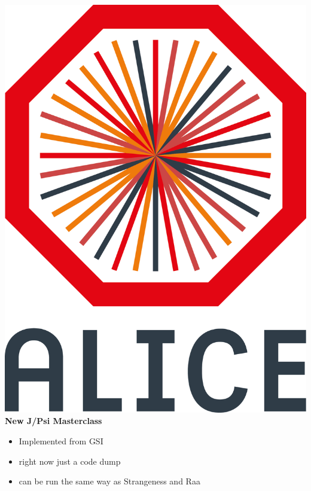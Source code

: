 \documentclass[aspectratio=169,14pt,dvipsnames]{beamer}
\begin{document}
\begin{frame}{\includegraphics[height=0.07\textheight]{2012-Jul-04-4_Color_Logo_CB.png} \hspace{0.2cm}\textbf{New J/Psi Masterclass}}
  \begin{itemize}
    \item Implemented from GSI
    \item right now just a code dump
    \item can be run the same way as Strangeness and Raa
  \end{itemize}
\end{frame}
\end{document}
